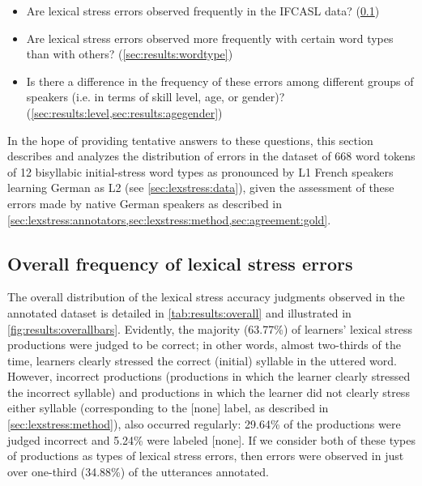 		\begin{itemize}[topsep=-.5em]
	\item{Are lexical stress errors observed frequently in the IFCASL data? (\cref{sec:results:overall})}
	\item{Are lexical stress errors observed more frequently with certain word types than with others?  (\cref{sec:results:wordtype})}
	\item{Is there a difference in the frequency of these errors among different groups of speakers (i.e. in terms of skill level, age, or gender)? (\cref{sec:results:level,sec:results:agegender})
	}
	\end{itemize}
	
		In the hope of providing tentative answers to these questions, this section describes and analyzes the distribution of errors in the dataset of 668 word tokens of 12 bisyllabic initial-stress word types as pronounced by L1 French speakers learning German as L2 (see \cref{sec:lexstress:data}), given the assessment of these errors made by native German speakers as described in \cref{sec:lexstress:annotators,sec:lexstress:method,sec:agreement:gold}.
			
		\subsection{Overall frequency of lexical stress errors}
		\label{sec:results:overall}
		
		
		The overall distribution of the lexical stress accuracy judgments observed in the annotated dataset is detailed in \cref{tab:results:overall} and illustrated in \cref{fig:results:overallbars}. Evidently, the majority (63.77\%) of learners' lexical stress productions were judged to be correct; in other words, almost two-thirds of the time, learners 
		clearly stressed the correct (initial) syllable in the uttered word.
		However, incorrect productions (productions in which the learner clearly stressed the incorrect syllable) and productions in which the learner did not clearly stress either syllable (corresponding to the [none] label, as described in \cref{sec:lexstress:method}), also occurred regularly: 29.64\% of the productions were judged incorrect and 5.24\% were labeled [none]. If we consider both of these types of productions as types of lexical stress errors, then errors were observed in just over one-third (34.88\%) of the  utterances annotated. 
		
